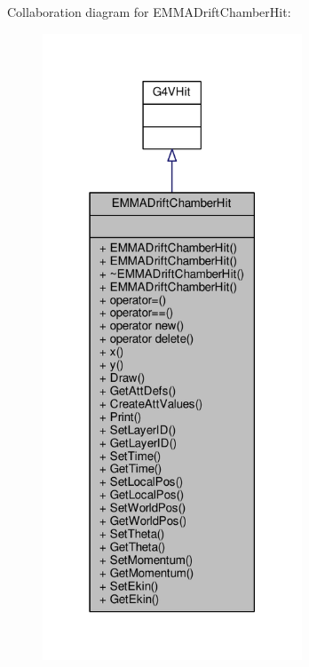 Collaboration diagram for E\+M\+M\+A\+Drift\+Chamber\+Hit\+:
\nopagebreak
\begin{figure}[H]
\begin{center}
\leavevmode
\includegraphics[width=219pt]{classEMMADriftChamberHit__coll__graph}
\end{center}
\end{figure}
